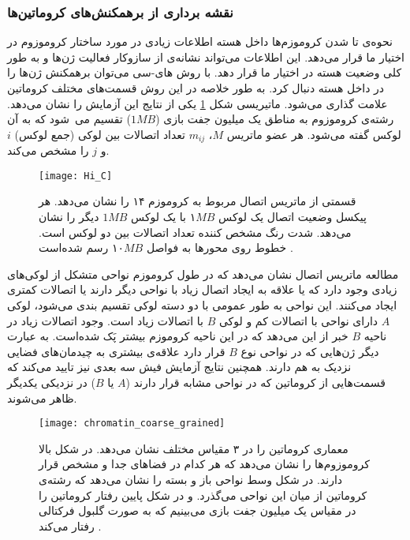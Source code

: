 \subsubsection{نقشه برداری از برهمکنش‌های کروماتین‌ها}
نحوه‌ی تا شدن کروموزم‌ها داخل هسته اطلاعات زیادی در مورد ساختار کروموزوم در اختیار ما قرار می‌دهد. این اطلاعات می‌تواند نشانه‌ی از سازوکار فعالیت ژن‌ها و به طور کلی وضعیت هسته در اختیار ما قرار دهد. با روش های-سی \cite{Lieberman-Aiden289} می‌توان برهمکنش ژن‌ها را در داخل هسته دنبال کرد. به طور خلاصه در این روش قسمت‌های مختلف کروماتین  علامت گذاری می‌شود.  ماتیریسی شکل \ref{fig:Hi-C} یکی از نتایج این آزمایش را نشان می‌دهد. رشته‌ی کروموزوم به مناطق یک میلیون جفت بازی ($1MB$)  تقسیم می شود که به آن لوکس گفته می‌شود. هر عضو ماتریس $M$، $m_{ij}$  تعداد اتصالات بین لوکی (جمع لوکس) $i$ و $j$ را مشخص می‌کند.
\begin{figure}[htbp]
\begin{center}
\texttt{[image: Hi\_C]}
\caption{
  قسمتی از ماتریس اتصال مربوط به کروموزم ۱۴ را نشان می‌دهد. هر پیکسل وضعیت اتصال یک لوکس $۱MB$ با یک لوکس $1MB$ دیگر را نشان می‌دهد. شدت رنگ مشخص کننده تعداد اتصالات بین دو لوکس است. خطوط روی محورها به فواصل $۱۰MB$ رسم شده‌است \cite{Lieberman-Aiden289}.
}
\label{fig:Hi-C}
\end{center}
\end{figure}



مطالعه ماتریس اتصال نشان می‌دهد که در طول کروموزم نواحی متشکل از لوکی‌های زیادی وجود دارد که یا علاقه به ایجاد اتصال زیاد با نواحی دیگر دارند یا اتصالات کمتری ایجاد می‌کنند. این نواحی  به طور عمومی‌ با دو دسته لوکی تقسیم بندی می‌شود، لوکی $A$ دارای نواحی با اتصالات کم و لوکی $B$ با اتصالات زیاد است. وجود اتصالات زیاد در ناحیه $B$ خبر از این می‌دهد که در این ناحیه کروموزم بیشتر پَک  شده‌است. به عبارت دیگر ژن‌هایی که در نواحی نوع $B$ قرار دارد علاقه‌ی بیشتری به چیدمان‌های فضایی نزدیک به هم دارند. همچنین نتایج آزمایش‌ فیش سه بعدی نیز تایید می‌کند که قسمت‌هایی از کروماتین که در نواحی مشابه قرار دارند ($A$ یا $B$) در نزدیکی یکدیگر ظاهر می‌شوند. 
\begin{figure}[htbp]
\begin{center}
\texttt{[image: chromatin\_coarse\_grained]}
\caption{
 معماری کروماتین را در ۳ مقیاس مختلف نشان می‌دهد. در شکل بالا کروموزوم‌ها را نشان می‌دهد که هر کدام در فضا‌های جدا و مشخص قرار دارند. در شکل وسط نواحی باز و بسته را نشان می‌دهد که رشته‌ی کروماتین از میان این نواحی می‌گذرد. و در شکل پایین رفتار کروماتین را در مقیاس یک میلیون جفت بازی می‌بینیم که به صورت گلبول فرکتالی رفتار می‌کند \cite{Lieberman-Aiden289}.
}
\label{fig:chromo_coarse}
\end{center}
\end{figure}

